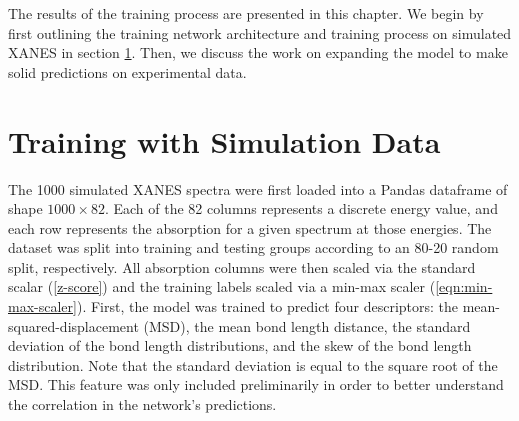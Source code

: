 The results of the training process are presented in this chapter. We begin by first outlining the training network architecture and training process on simulated XANES in section \ref{sec:nn-sim-data}. Then, we discuss the work on expanding the model to make solid predictions on experimental data.

\section{Training with Simulation Data} \label{sec:nn-sim-data}

The 1000 simulated XANES spectra were first loaded into a Pandas dataframe \cite{pandas-1} \cite{pandas-2} of shape $ 1000\times82 $. Each of the 82 columns represents a discrete energy value, and each row represents the absorption for a given spectrum at those energies. The dataset was split into training and testing groups according to an 80-20 random split, respectively. All absorption columns were then scaled via the standard scalar (\ref{z-score}) and the training labels scaled via a min-max scaler (\ref{eqn:min-max-scaler}). First, the model was trained to predict four descriptors: the mean-squared-displacement (MSD), the mean bond length distance, the standard deviation of the bond length distributions, and the skew of the bond length distribution. Note that the standard deviation is equal to the square root of the MSD. This feature was only included preliminarily in order to better understand the correlation in the network's predictions. 

